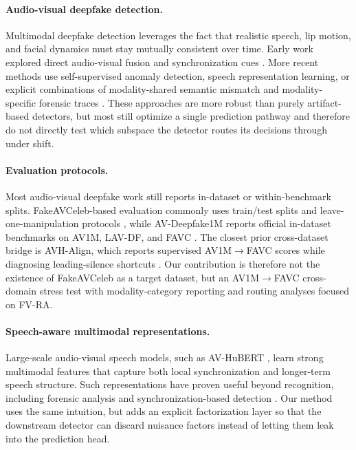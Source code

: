 \documentclass{article}
\begin{document}
\paragraph{Audio-visual deepfake detection.}
Multimodal deepfake detection leverages the fact that realistic speech, lip motion, and facial dynamics must stay mutually consistent over time. Early work explored direct audio-visual fusion and synchronization cues \citep{zhou2021jointav, chung2016syncnet}. More recent methods use self-supervised anomaly detection, speech representation learning, or explicit combinations of modality-shared semantic mismatch and modality-specific forensic traces \citep{feng2023avad, liang2024speechforensics, smeu2025avhalign, du2025cad}. These approaches are more robust than purely artifact-based detectors, but most still optimize a single prediction pathway and therefore do not directly test which subspace the detector routes its decisions through under shift.

\paragraph{Evaluation protocols.}
Most audio-visual deepfake work still reports in-dataset or within-benchmark splits. FakeAVCeleb-based evaluation commonly uses train/test splits and leave-one-manipulation protocols \citep{feng2023avad, oorloff2024avff}, while AV-Deepfake1M reports official in-dataset benchmarks on AV1M, LAV-DF, and FAVC \citep{cai2024avdeepfake1m}. The closest prior cross-dataset bridge is AVH-Align, which reports supervised AV1M$\rightarrow$FAVC scores while diagnosing leading-silence shortcuts \citep{smeu2025avhalign}. Our contribution is therefore not the existence of FakeAVCeleb as a target dataset, but an AV1M$\rightarrow$FAVC cross-domain stress test with modality-category reporting and routing analyses focused on FV-RA.

\paragraph{Speech-aware multimodal representations.}
Large-scale audio-visual speech models, such as AV-HuBERT \citep{shi2022avhubert}, learn strong multimodal features that capture both local synchronization and longer-term speech structure. Such representations have proven useful beyond recognition, including forensic analysis and synchronization-based detection \citep{liang2024speechforensics, smeu2025avhalign}. Our method uses the same intuition, but adds an explicit factorization layer so that the downstream detector can discard nuisance factors instead of letting them leak into the prediction head.
\end{document}
